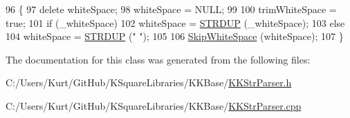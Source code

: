 \begin{DoxyCode}
96 \{
97   \textcolor{keyword}{delete}  whiteSpace;  
98   whiteSpace = NULL;
99 
100   trimWhiteSpace = \textcolor{keyword}{true};
101   \textcolor{keywordflow}{if}  (\_whiteSpace)
102     whiteSpace = \hyperlink{namespace_k_k_b_a24920fb971ac6f99f94e9fb8ee8343d3}{STRDUP} (\_whiteSpace);
103   \textcolor{keywordflow}{else}
104     whiteSpace = \hyperlink{namespace_k_k_b_a24920fb971ac6f99f94e9fb8ee8343d3}{STRDUP} (\textcolor{stringliteral}{" "});
105 
106   \hyperlink{class_k_k_b_1_1_k_k_str_parser_a8e19e3cdb9d6c2aa6058d527fef76d01}{SkipWhiteSpace} (whiteSpace);
107 \}
\end{DoxyCode}


The documentation for this class was generated from the following files\+:\begin{DoxyCompactItemize}
\item 
C\+:/\+Users/\+Kurt/\+Git\+Hub/\+K\+Square\+Libraries/\+K\+K\+Base/\hyperlink{_k_k_str_parser_8h}{K\+K\+Str\+Parser.\+h}\item 
C\+:/\+Users/\+Kurt/\+Git\+Hub/\+K\+Square\+Libraries/\+K\+K\+Base/\hyperlink{_k_k_str_parser_8cpp}{K\+K\+Str\+Parser.\+cpp}\end{DoxyCompactItemize}
